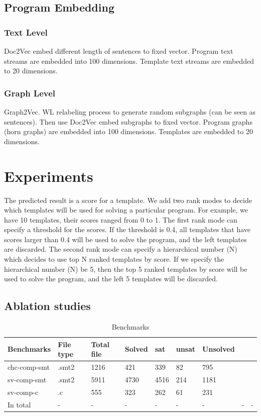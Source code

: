 \documentclass{article}
\begin{document}
\subsection{Program Embedding}

\subsubsection{Text Level}
Doc2Vec \cite{DBLP:journals/corr/LeM14} embed different length of sentences to fixed vector.
Program text streams are embedded into 100 dimensions. Template text streams are embedded to 20 dimensions.
\subsubsection{Graph Level}
Graph2Vec\cite{DBLP:journals/corr/NarayananCVCLJ17}.
WL relabeling process \cite{WL_relabeling_process} to generate random subgraphs (can be seen as sentences). Then use Doc2Vec embed subgraphs to fixed vector.
Program graphs (horn graphs) are embedded into 100 dimensions. Templates are embedded to 20 dimensions.



\section{Experiments}
The predicted result is a score for a template. We add two rank modes to decide which templates will be used for solving a particular program. For example, we have 10 templates, their scores ranged from 0 to 1. The first rank mode can specify a threshold for the scores. If the threshold is 0.4, all templates that have scores larger than 0.4 will be used to solve the program, and the left templates are discarded. The second rank mode can specify a hierarchical number (N) which decides to use top N ranked templates by score. If we specify the hierarchical number (N) be 5, then the top 5 ranked templates by score will be used to solve the program, and the left 5 templates will be discarded.

\subsection{Ablation studies}



\begin{table}\caption{Benchmarks}
\begin{center}
\begin{tabular}{lp{1cm}p{1cm}p{1.5cm}p{1.5cm}p{1.5cm}p{1.5cm}p{1.5cm}p{1.5cm}}
\hline
Benchmarks & File type & Total file & Solved & sat & unsat & Unsolved  \\
\hline
chc-comp-smt & .smt2 & 1216 & 421  & 339  & 82    & 795 \\
sv-comp-smt &.smt2   & 5911 & 4730 & 4516 & 214  & 1181 \\
sv-comp-c &.c        & 555  & 323  & 262  & 61   & 231 \\
In total  & - & - & -&-&-&-&-&-\\
\hline
\end{tabular}
\end{center}
\end{table}
\end{document}
